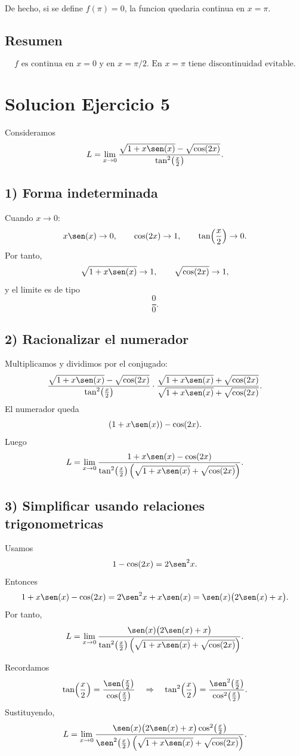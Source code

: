 \documentclass[12pt]{article}
\begin{document}
De hecho, si se define $f(\pi)=0$, la funcion quedaria continua en $x=\pi$.

\subsection*{Resumen}
\[
\boxed{
\text{$f$ es continua en $x=0$ y en $x=\pi/2$. En $x=\pi$ tiene discontinuidad evitable.}
}
\]

\section*{Solucion Ejercicio 5}

Consideramos
\[
L=\lim_{x\to 0}\frac{\sqrt{1+x\sen(x)}-\sqrt{\cos(2x)}}{\tan^2\!\left(\frac{x}{2}\right)}.
\]

\subsection*{1) Forma indeterminada}

Cuando $x\to 0$:
\[
x\sen(x)\to 0, \qquad \cos(2x)\to 1, \qquad \tan\!\left(\frac{x}{2}\right)\to 0.
\]
Por tanto,
\[
\sqrt{1+x\sen(x)}\to 1, \qquad \sqrt{\cos(2x)}\to 1,
\]
y el limite es de tipo
\[
\frac{0}{0}.
\]

\subsection*{2) Racionalizar el numerador}

Multiplicamos y dividimos por el conjugado:
\[
\frac{\sqrt{1+x\sen(x)}-\sqrt{\cos(2x)}}{\tan^2\!\left(\frac{x}{2}\right)}
\cdot
\frac{\sqrt{1+x\sen(x)}+\sqrt{\cos(2x)}}{\sqrt{1+x\sen(x)}+\sqrt{\cos(2x)}}.
\]
El numerador queda
\[
(1+x\sen(x))-\cos(2x).
\]
Luego
\[
L=\lim_{x\to 0}
\frac{1+x\sen(x)-\cos(2x)}
{\tan^2\!\left(\frac{x}{2}\right)\left(\sqrt{1+x\sen(x)}+\sqrt{\cos(2x)}\right)}.
\]

\subsection*{3) Simplificar usando relaciones trigonometricas}

Usamos
\[
1-\cos(2x)=2\sen^2 x.
\]
Entonces
\[
1+x\sen(x)-\cos(2x)
=2\sen^2 x + x\sen(x)
=\sen(x)\bigl(2\sen(x)+x\bigr).
\]
Por tanto,
\[
L=\lim_{x\to 0}
\frac{\sen(x)\bigl(2\sen(x)+x\bigr)}
{\tan^2\!\left(\frac{x}{2}\right)\left(\sqrt{1+x\sen(x)}+\sqrt{\cos(2x)}\right)}.
\]

Recordamos
\[
\tan\!\left(\frac{x}{2}\right)
=\frac{\sen\!\left(\frac{x}{2}\right)}{\cos\!\left(\frac{x}{2}\right)}
\quad\Rightarrow\quad
\tan^2\!\left(\frac{x}{2}\right)
=\frac{\sen^2\!\left(\frac{x}{2}\right)}{\cos^2\!\left(\frac{x}{2}\right)}.
\]
Sustituyendo,
\[
L=\lim_{x\to 0}
\frac{\sen(x)\bigl(2\sen(x)+x\bigr)\cos^2\!\left(\frac{x}{2}\right)}
{\sen^2\!\left(\frac{x}{2}\right)\left(\sqrt{1+x\sen(x)}+\sqrt{\cos(2x)}\right)}.
\]
\end{document}
